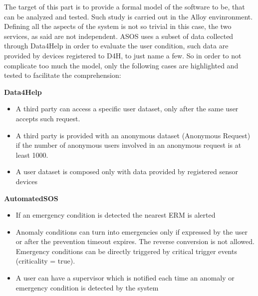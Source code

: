 \setlength{\parskip}{0.3cm}

The target of this part is to provide a formal model of the software to be, that can be analyzed and tested. Such study is carried out in the Alloy envinronment.  Defining all the aspects of the system is not so trivial in this case, the two services, as said are not independent. ASOS uses a subset of data collected through Data4Help in order to evaluate the user condition, such data are provided by devices registered to D4H, to just name a few.
So in order to not complicate too much the model, only the following  cases are highlighted and tested to facilitate the comprehension:
\par
\textbf{Data4Help}

\begin{itemize}[topsep=-0.1cm]
	\item A third party can access a specific user dataset, only after the same user accepts such request. 
	\item A third party is provided with an anonymous dataset (Anonymous Request) if the number of anonymous users involved in an anonymous request is at least 1000. 
	\item A user dataset is composed only with data provided by registered sensor devices
\end{itemize}

\textbf{AutomatedSOS}
\begin{itemize}
	\item If an emergency condition is detected the nearest ERM is alerted
	\item Anomaly conditions can turn into emergencies only if expressed by the user or after the prevention timeout expires. The reverse conversion is not allowed. Emergency conditions can be directly triggered by critical trigger events (criticality = true).
	\item A user can have a supervisor which is notified each time an anomaly or emergency condition is detected by the system
\end{itemize}


{}
{}


